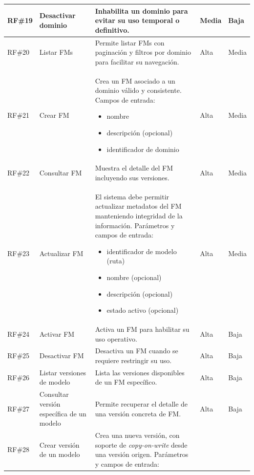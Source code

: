 \begin{longtable}{|p{1cm}|p{4cm}|p{5.2cm}|p{1.9cm}|p{1.9cm}|}
	\hline
	\rowcolor[HTML]{EDEBF1}
	\ac{RF}\#19 & Desactivar dominio & Inhabilita un dominio para evitar su uso temporal o definitivo. & Media & Baja \\
	\hline
	\ac{RF}\#20 & Listar \ac{FM}s & Permite listar \ac{FM}s con paginación y filtros por dominio para facilitar su navegación. & Alta & Media \\
	\hline
	\rowcolor[HTML]{EDEBF1}
	\ac{RF}\#21 & Crear \ac{FM} & Crea un \ac{FM} asociado a un dominio válido y consistente. Campos de entrada:
		\begin{itemize}
			\item nombre
			\item descripción (opcional)
			\item identificador de dominio
		\end{itemize}
	& Alta & Media \\
	\hline
	\ac{RF}\#22 & Consultar \ac{FM} & Muestra el detalle del \ac{FM} incluyendo sus versiones. & Alta & Media \\
	\hline
	\rowcolor[HTML]{EDEBF1}
	\ac{RF}\#23 & Actualizar \ac{FM} & El sistema debe permitir actualizar metadatos del \ac{FM} manteniendo integridad de la información. Parámetros y campos de entrada:
		\begin{itemize}
			\item identificador de modelo (ruta)
			\item nombre (opcional)
			\item descripción (opcional)
			\item estado activo (opcional)
		\end{itemize}
	& Alta & Media \\
	\hline
	\ac{RF}\#24 & Activar \ac{FM} & Activa un \ac{FM} para habilitar su uso operativo. & Alta & Baja \\
	\hline
	\rowcolor[HTML]{EDEBF1}
	\ac{RF}\#25 & Desactivar \ac{FM} & Desactiva un \ac{FM} cuando se requiere restringir su uso. & Alta & Baja \\
	\hline
	\ac{RF}\#26 & Listar versiones de modelo & Lista las versiones disponibles de un \ac{FM} específico. & Alta & Baja \\
	\hline
	\rowcolor[HTML]{EDEBF1}
	\ac{RF}\#27 & Consultar versión específica de un modelo & Permite recuperar el detalle de una versión concreta de \ac{FM}. & Alta & Baja \\
	\hline
	\ac{RF}\#28 & Crear versión de un modelo & Crea una nueva versión, con soporte de \textit{copy-on-write} desde una versión origen. Parámetros y campos de entrada:

\end{longtable}
